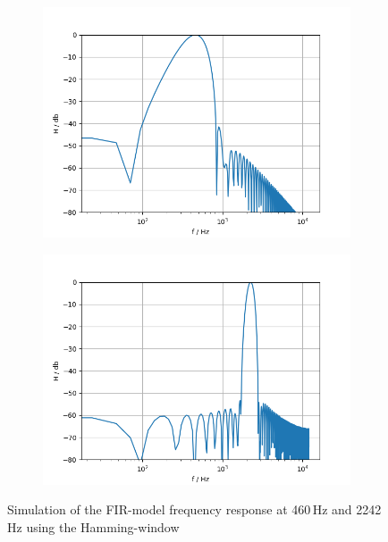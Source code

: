 \begin{figure}[!h]
    \centering
    \begin{subfigure}[c]{0.49\textwidth}
        \centering
        \includegraphics[width=\textwidth]{img/fir_bandpass460_hamming.png}
    \end{subfigure}
    \begin{subfigure}[c]{0.49\textwidth}
        \centering
        \includegraphics[width=\textwidth]{img/fir_bandpass2242_hamming.png}
    \end{subfigure}
    \caption{Simulation of the \ac{FIR}-model frequency response at 460\,Hz and 2242\,Hz using the Hamming-window}
    \label{fig:fir-sim-hamming}
\end{figure}


